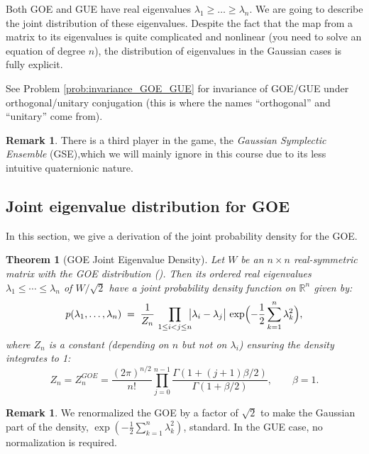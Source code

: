 \documentclass[letterpaper,11pt,oneside,reqno]{article}
\numberwithin{equation}{section}
\newtheorem{theorem}[proposition]{Theorem}
\theoremstyle{definition}
\newtheorem{remark}[proposition]{Remark}
\begin{document}
Both GOE and GUE have real eigenvalues $\lambda_1 \ge \ldots \ge \lambda_n$.
We are going to describe the joint distribution of these eigenvalues.
Despite the fact that the map from a matrix to its eigenvalues
is quite complicated and nonlinear (you need to solve an equation of degree $n$),
the distribution of eigenvalues in the Gaussian cases is fully explicit.

See Problem \ref{prob:invariance_GOE_GUE}
for invariance of GOE/GUE under orthogonal/unitary conjugation
(this is where the names ``orthogonal'' and ``unitary'' come from).

\begin{remark}
	There is a third player in the game, the \emph{Gaussian
	Symplectic Ensemble} (GSE),which we will mainly ignore in
	this course
	due to its less intuitive quaternionic nature.
\end{remark}

\subsection{Joint eigenvalue distribution for GOE}
\label{sub:GOE-derivation}

In this section, we give a derivation of the joint probability density for the GOE.

\begin{theorem}[GOE Joint Eigenvalue Density]
\label{thm:GOE-joint-eigs-detailed}
Let \(W\) be an \(n\times n\) real-symmetric matrix with
the GOE distribution ().
Then its ordered real eigenvalues \(\lambda_1 \le \cdots \le
\lambda_n\) 
of $W/\sqrt 2$
have a joint probability density function
on $\mathbb{R}^n$
given by:
\[
  p(\lambda_1,\ldots,\lambda_n)
  \;=\;\frac{1}{Z_{n}}
  \,\prod_{1 \le i < j \le n}
  \!\!\bigl|\lambda_i - \lambda_j\bigr|\,
  \exp\Bigl(
    -\frac{1}{2}\sum_{k=1}^n \lambda_k^2
  \Bigr),
\]
where \(Z_{n}\) is a constant (depending on \(n\) but not on \(\lambda_i\)) ensuring the density integrates to 1:
\begin{equation*}
	Z_n=Z_n^{GOE}=\frac{(2\pi)^{n/2}}{n!}
	\prod_{j=0}^{n-1}\frac{\Gamma(1+(j+1)\beta/2)}{\Gamma(1+\beta/2)}, \qquad 
	\beta=1.
\end{equation*}
\end{theorem}
\begin{remark}
	We renormalized the GOE by a factor of $\sqrt 2$ to make the 
	Gaussian part of the density, $\exp(-\frac{1}{2}\sum_{k=1}^n \lambda_k^2)$,
	standard. In the GUE case, no normalization is required.
\end{remark}
\end{document}
